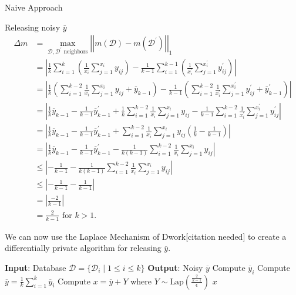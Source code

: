 \documentclass[11pt]{article}
\begin{document}
\begin{section}{Naive Approach}
\begin{subsection}{Releasing noisy $\overline{y}$}
\begin{align*}
\Delta m &= \max_{\mathcal{D},\mathcal{D^{'}}\text{ neighbors}}
   \left|\left|
     m(\mathcal{D}) - m(\mathcal{D}^{'})
   \right|\right|_1 \\
&= \left|
    \frac{1}{k} \sum_{i=1}^k 
      \left( 
        \frac{1}{x_i} \sum_{j=1}^{x_i} y_{ij} 
      \right) 
    -\frac{1}{k-1} \sum_{i=1}^{k-1} 
       \left(
         \frac{1}{x_i^{'}} \sum_{j=1}^{x_i^{'}} y_{ij}^{'}
       \right)
   \right|\\
&= \left|
    \frac{1}{k} 
      \left(
        \sum_{i=1}^{k-2} \frac{1}{x_i} \sum_{j=1}^{x_i} y_{ij} +
        \overline{y}_{k-1}
      \right) 
    - \frac{1}{k-1}
      \left(
        \sum_{i=1}^{k-2} \frac{1}{x_i^{'}} \sum_{j=1}^{x_i^{'}} y_{ij}^{'} + 
        \overline{y}_{k-1}^{'}
      \right)
    \right|\\
&= \left|
    \frac{1}{k} \overline{y}_{k-1} - \frac{1}{k-1} \overline{y}_{k-1}^{'} + 
    \frac{1}{k} \sum_{i=1}^{k-2} \frac{1}{x_i} \sum_{j=1}^{x_i} y_{ij} - 
    \frac{1}{k-1} \sum_{i=1}^{k-2} \frac{1}{x_i^{'}} \sum_{j=1}^{x_i^{'}} 
    y_{ij}^{'}
   \right|\\
&= \left|
    \frac{1}{k} \overline{y}_{k-1} - \frac{1}{k-1} \overline{y}_{k-1}^{'} + 
    \sum_{i=1}^{k-2} \frac{1}{x_i} \sum_{j=1}^{x_i} y_{ij} 
      \left(
        \frac{1}{k} - \frac{1}{k-1}
      \right)
   \right|\\
&= \left|
    \frac{1}{k} \overline{y}_{k-1} - \frac{1}{k-1} \overline{y}_{k-1}^{'} - 
    \frac{1}{k(k-1)} \sum_{i=1}^{k-2} \frac{1}{x_i} \sum_{j=1}^{x_i} y_{ij}
   \right|\\
&\leq \left|
        -\frac{1}{k-1} - \frac{1}{k(k-1)} \sum_{i=1}^{k-2} \frac{1}{x_i}
        \sum_{j=1}^{x_i} y_{ij}
      \right|\\
&\leq \left|
        -\frac{1}{k-1} - \frac{1}{k-1}
      \right|\\
&= \left|
     \frac{-2}{k-1}
   \right|\\
&= \frac{2}{k-1} \text{  for $k>1$.}
\end{align*}

We can now use the Laplace Mechanism of Dwork[citation needed] to create a 
differentially private algorithm for releasing $\overline{y}$.

\begin{algorithm}
  \caption{}
  \label{alg-label}
  \begin{algorithmic}
    \STATE \textbf{Input}: Database $\mathcal{D} = \{\mathcal{D}_i \; |\; 
    1\leq i \leq k \}$
    \STATE \textbf{Output}: Noisy $\overline{y}$
      \STATE Compute $\overline{y}_i$
    \ENDFOR
    \STATE Compute $\overline{y} = \frac{1}{k} \sum_{i=1}^{k} \overline{y}_i$
    \STATE Compute $x = \overline{y} + Y$ where $Y \sim \text{Lap}
    (\frac{\frac{2}{k-1}}{\epsilon})$
    \RETURN $x$
  \end{algorithmic}
\end{algorithm}


\end{subsection}
\end{section}
\end{document}
